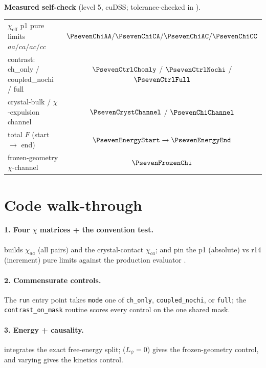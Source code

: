 \begin{keybox}
\textbf{Measured self-check} (level 5, cuDSS; tolerance-checked in
).
\begin{center}\small
\begin{tabular}{lc}
\toprule
$\chi_{\text{eff}}$ p1 pure limits $aa/ca/ac/cc$ & $\ensuremath{\PsevenChiAA}/\ensuremath{\PsevenChiCA}/\ensuremath{\PsevenChiAC}/\ensuremath{\PsevenChiCC}$ \\
contrast: ch\_only / coupled\_nochi / full & $\ensuremath{\PsevenCtrlChonly}$ / $\ensuremath{\PsevenCtrlNochi}$ / $\ensuremath{\PsevenCtrlFull}$ \\
crystal-bulk / $\chi$-expulsion channel & $\ensuremath{\PsevenCrystChannel}$ / $\ensuremath{\PsevenChiChannel}$ \\
total $F$ (start $\to$ end) & $\ensuremath{\PsevenEnergyStart} \to \ensuremath{\PsevenEnergyEnd}$ \\
frozen-geometry $\chi$-channel & $\ensuremath{\PsevenFrozenChi}$ \\
\bottomrule
\end{tabular}
\end{center}
\end{keybox}

\section{Code walk-through}

\paragraph{1. Four $\chi$ matrices + the convention test.} 
builds $\chi_{aa}$ (all pairs) and the crystal-contact $\chi_{ca}$;
 and  pin the p1
(absolute) vs r14 (increment) pure limits against the production evaluator
.

\paragraph{2. Commensurate controls.} The \texttt{run} entry point takes \texttt{mode} one of
\texttt{ch\_only}, \texttt{coupled\_nochi}, or \texttt{full}; the
\texttt{contrast\_on\_mask} routine scores every control on the one
shared mask.

\paragraph{3. Energy + causality.}  integrates the
exact free-energy split;  ($L_\psi{=}0$) gives the
frozen-geometry control, and varying  gives the kinetics
control.

